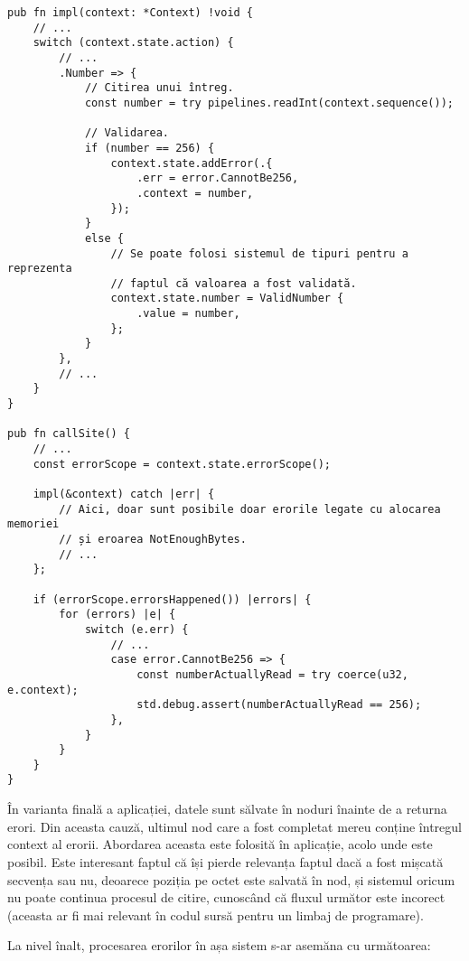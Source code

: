 \documentclass[a4paper,12pt]{report}
\begin{document}
\begin{verbatim}
pub fn impl(context: *Context) !void {
    // ...
    switch (context.state.action) {
        // ...
        .Number => {
            // Citirea unui întreg.
            const number = try pipelines.readInt(context.sequence());

            // Validarea.
            if (number == 256) {
                context.state.addError(.{
                    .err = error.CannotBe256,
                    .context = number,
                });
            }
            else {
                // Se poate folosi sistemul de tipuri pentru a reprezenta
                // faptul că valoarea a fost validată.
                context.state.number = ValidNumber {
                    .value = number,
                };
            }
        },
        // ...
    }
}

pub fn callSite() {
    // ... 
    const errorScope = context.state.errorScope();

    impl(&context) catch |err| {
        // Aici, doar sunt posibile doar erorile legate cu alocarea memoriei
        // și eroarea NotEnoughBytes.
        // ...
    };

    if (errorScope.errorsHappened()) |errors| {
        for (errors) |e| {
            switch (e.err) {
                // ...
                case error.CannotBe256 => {
                    const numberActuallyRead = try coerce(u32, e.context);
                    std.debug.assert(numberActuallyRead == 256);
                },
            }
        }
    }
}
\end{verbatim}

În varianta finală a aplicației, datele sunt sălvate în noduri înainte de a returna erori.
Din aceasta cauză, ultimul nod care a fost completat mereu conține întregul context al erorii.
Abordarea aceasta este folosită în aplicație, acolo unde este posibil.
Este interesant faptul că își pierde relevanța faptul dacă a fost mișcată secvența sau nu,
deoarece poziția pe octet este salvată în nod, și sistemul oricum nu poate continua procesul de citire,
cunoscând că fluxul următor este incorect
(aceasta ar fi mai relevant în codul sursă pentru un limbaj de programare).

La nivel înalt, procesarea erorilor în așa sistem s-ar asemăna cu următoarea:
\end{document}
